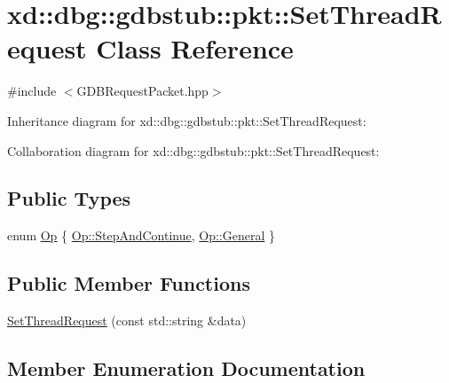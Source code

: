 \hypertarget{classxd_1_1dbg_1_1gdbstub_1_1pkt_1_1_set_thread_request}{}\section{xd\+:\+:dbg\+:\+:gdbstub\+:\+:pkt\+:\+:Set\+Thread\+Request Class Reference}
\label{classxd_1_1dbg_1_1gdbstub_1_1pkt_1_1_set_thread_request}


{\ttfamily \#include $<$G\+D\+B\+Request\+Packet.\+hpp$>$}



Inheritance diagram for xd\+:\+:dbg\+:\+:gdbstub\+:\+:pkt\+:\+:Set\+Thread\+Request\+:


Collaboration diagram for xd\+:\+:dbg\+:\+:gdbstub\+:\+:pkt\+:\+:Set\+Thread\+Request\+:
\subsection*{Public Types}
\begin{DoxyCompactItemize}
\item 
enum \mbox{\hyperlink{classxd_1_1dbg_1_1gdbstub_1_1pkt_1_1_set_thread_request_a67434478e5a8cebb88ba6d7332fecb73}{Op}} \{ \mbox{\hyperlink{classxd_1_1dbg_1_1gdbstub_1_1pkt_1_1_set_thread_request_a67434478e5a8cebb88ba6d7332fecb73a2a9eee873c2aef1a0e0a5447b8e2f51e}{Op\+::\+Step\+And\+Continue}}, 
\mbox{\hyperlink{classxd_1_1dbg_1_1gdbstub_1_1pkt_1_1_set_thread_request_a67434478e5a8cebb88ba6d7332fecb73a0db377921f4ce762c62526131097968f}{Op\+::\+General}}
 \}
\end{DoxyCompactItemize}
\subsection*{Public Member Functions}
\begin{DoxyCompactItemize}
\item 
\mbox{\hyperlink{classxd_1_1dbg_1_1gdbstub_1_1pkt_1_1_set_thread_request_ade0cbe0509d0a1b0a81aa304647ef889}{Set\+Thread\+Request}} (const std\+::string \&data)
\end{DoxyCompactItemize}


\subsection{Member Enumeration Documentation}
\mbox{\label{classxd_1_1dbg_1_1gdbstub_1_1pkt_1_1_set_thread_request_a67434478e5a8cebb88ba6d7332fecb73}} 
